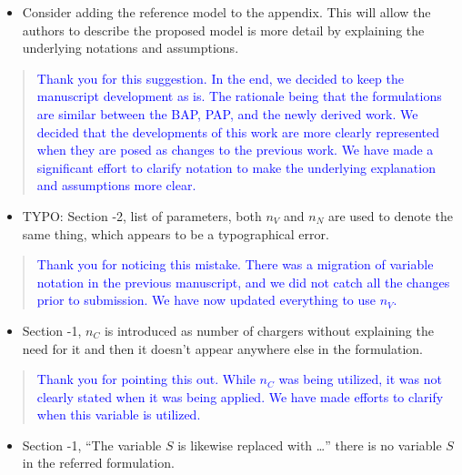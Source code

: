 \documentclass[11pt,a4paper,final]{article}
\begin{document}
\begin{itemize}
\item Consider adding the reference model to the appendix. This will allow the authors to describe the proposed model is more detail by explaining the underlying notations and assumptions.
\end{itemize}

\begin{quote}
\textcolor{blue}{Thank you for this suggestion. In the end, we decided to keep the manuscript development as is. The rationale being that the formulations are similar between the BAP, PAP, and the newly derived work. We decided that the developments of this work are more clearly represented when they are posed as changes to the previous work. We have made a significant effort to clarify notation to make the underlying explanation and assumptions more clear.}
\end{quote}

\begin{itemize}
\item TYPO: Section -2, list of parameters, both \(n_V\) and \(n_N\) are used to denote the same thing, which appears to be a typographical error.
\end{itemize}

\begin{quote}
\textcolor{blue}{Thank you for noticing this mistake. There was a migration of variable notation in the previous manuscript, and we did not catch all the changes prior to submission. We have now updated everything to use $n_V$.}
\end{quote}

\begin{itemize}
\item Section -1, \(n_C\) is introduced as number of chargers without explaining the need for it and then it doesn’t appear anywhere else in the formulation.
\end{itemize}

\begin{quote}
\textcolor{blue}{Thank you for pointing this out. While $n_C$ was being utilized, it was not clearly stated when it was being applied. We have made efforts to clarify when this variable is utilized.}
\end{quote}

\begin{itemize}
\item Section -1, “The variable \(S\) is likewise replaced with …” there is no variable \(S\) in the referred formulation.
\end{itemize}
\end{document}
